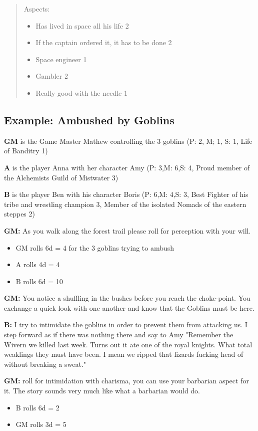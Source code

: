 \documentclass[11pt]{article}
\begin{document}
{\begin{quote}
Aspects:
\begin{itemize}
\item Has lived in space all his life 2
\item If the captain ordered it, it has to be done 2
\item Space engineer 1
\item Gambler 2
\item Really good with the needle 1
\end{itemize}
\end{quote}

\subsection{Example: Ambushed by Goblins}
\label{sec:org370912e}

\textbf{GM} is the Game Master Mathew controlling the 3 goblins (P: 2, M; 1, S: 1, Life of Banditry 1)

\textbf{A} is the player Anna with her character Amy (P: 3,M: 6,S: 4, Proud member of the Alchemists Guild of Mistwater 3)

\textbf{B} is the player Ben with his character Boris (P: 6,M: 4,S: 3, Best Fighter of his tribe and wrestling champion 3, Member of the isolated Nomads of the eastern steppes 2)

\textbf{GM:} As you walk along the forest trail please roll for perception with your will.
\begin{itemize}
\item GM rolls 6d = 4 for the 3 goblins trying to ambush
\item A rolls 4d =  4
\item B rolls 6d = 10
\end{itemize}

\textbf{GM:} You notice a shuffling in the bushes before you reach the choke-point. You exchange a quick look with one another and know that the Goblins must be here. 

\textbf{B:} I try to intimidate the goblins in order to prevent them from attacking us. I step forward as if there was nothing there and say to Amy "Remember the Wivern we killed last week. Turns out it ate one of the royal knights. What total weaklings they must have been. I mean we ripped that lizards fucking head of without breaking a sweat."

\textbf{GM:} roll for intimidation with charisma, you can use your barbarian aspect for it. The story sounds very much like what a barbarian would do.
\begin{itemize}
\item B rolls 6d = 2
\item GM rolls 3d = 5
\end{itemize}

}
\end{document}

